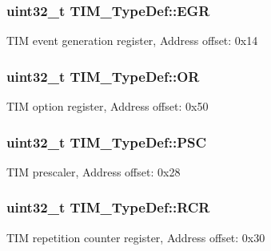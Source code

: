 \subsubsection[{\texorpdfstring{E\+GR}{EGR}}]{ uint32\+\_\+t T\+I\+M\+\_\+\+Type\+Def\+::\+E\+GR}\hypertarget{struct_t_i_m___type_def_a04248d87f48303fd2267810104a7878d}{}\label{struct_t_i_m___type_def_a04248d87f48303fd2267810104a7878d}
T\+IM event generation register, Address offset\+: 0x14 
\subsubsection[{\texorpdfstring{OR}{OR}}]{ uint32\+\_\+t T\+I\+M\+\_\+\+Type\+Def\+::\+OR}\hypertarget{struct_t_i_m___type_def_acb0e8a4efa46dac4a2fb1aa3d45924fd}{}\label{struct_t_i_m___type_def_acb0e8a4efa46dac4a2fb1aa3d45924fd}
T\+IM option register, Address offset\+: 0x50 
\subsubsection[{\texorpdfstring{P\+SC}{PSC}}]{ uint32\+\_\+t T\+I\+M\+\_\+\+Type\+Def\+::\+P\+SC}\hypertarget{struct_t_i_m___type_def_ad03c852f58077a11e75f8af42fa6d921}{}\label{struct_t_i_m___type_def_ad03c852f58077a11e75f8af42fa6d921}
T\+IM prescaler, Address offset\+: 0x28 
\subsubsection[{\texorpdfstring{R\+CR}{RCR}}]{ uint32\+\_\+t T\+I\+M\+\_\+\+Type\+Def\+::\+R\+CR}\hypertarget{struct_t_i_m___type_def_ad432e2a315abf68e6c295fb4ebc37534}{}\label{struct_t_i_m___type_def_ad432e2a315abf68e6c295fb4ebc37534}
T\+IM repetition counter register, Address offset\+: 0x30 
